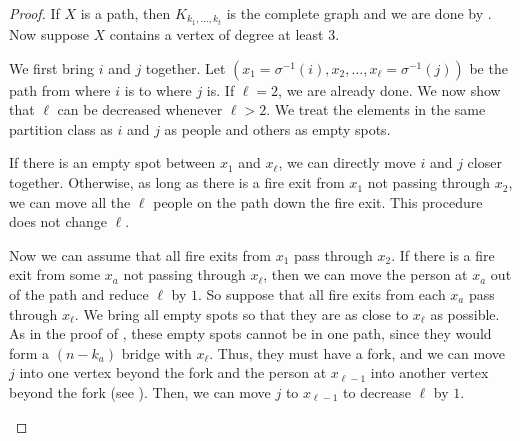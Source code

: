 \documentclass{mystyle}
\begin{document}
\begin{proof}
    If $X$ is a path, then $K_{k_1, \ldots, k_t}$ is the complete graph and we are done by . Now suppose $X$ contains a vertex of degree at least $3$. 
    
    We first bring $i$ and $j$ together. Let $(x_1 = \sigma^{-1}(i), x_2, \ldots, x_\ell= \sigma^{-1}(j))$ be the path from where $i$ is to where $j$ is. If $\ell = 2$, we are already done. We now show that $\ell$ can be decreased whenever $\ell > 2$. We treat the elements in the same partition class as $i$ and $j$ as people and others as empty spots.

    If there is an empty spot between $x_1$ and $x_\ell$, we can directly move $i$ and $j$ closer together. Otherwise, as long as there is a fire exit from $x_1$ not passing through $x_2$, we can move all the $\ell$ people on the path down the fire exit. This procedure does not change $\ell$. 
    
    Now we can assume that all fire exits from $x_1$ pass through $x_2$. If there is a fire exit from some $x_a$ not passing through $x_\ell$, then we can move the person at $x_a$ out of the path and reduce $\ell$ by $1$. So suppose that all fire exits from each $x_a$ pass through $x_\ell$. We bring all empty spots so that they are as close to $x_\ell$ as possible. As in the proof of , 
    these empty spots cannot be in one path, since they would form a $(n - k_a)$ bridge with $x_\ell$. Thus, they must have a fork, and we can move $j$ into one vertex beyond the fork and the person at $x_{\ell-1}$ into another vertex beyond the fork (see ). Then, we can move $j$ to $x_{\ell - 1}$ to decrease $\ell$ by $1$. 

    \begin{figure}[ht]
            \centering
\end{figure}
\end{proof}
\end{document}
